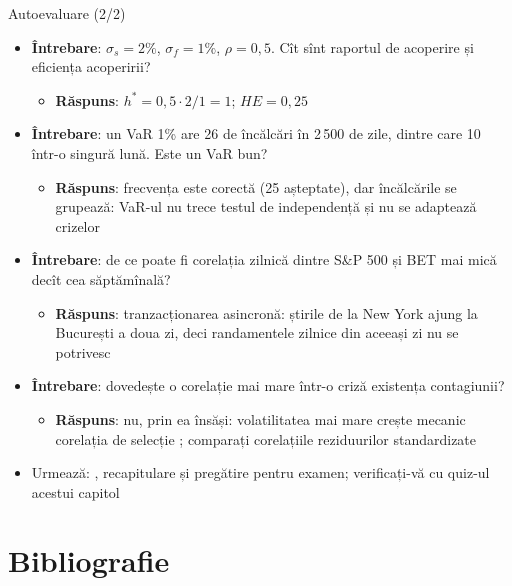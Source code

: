 \begin{frame}{Autoevaluare (2/2)}
\itemsize{\footnotesize}
\begin{itemize}
    \item \textbf{Întrebare}: $\sigma_s = 2\%$, $\sigma_f = 1\%$, $\rho = 0{,}5$. Cît sînt raportul de acoperire și eficiența acoperirii?
    \begin{itemize}
        \item \textbf{Răspuns}: $h^* = 0{,}5 \cdot 2/1 = 1$; $HE = 0{,}25$
    \end{itemize}
    \item \textbf{Întrebare}: un VaR 1\% are 26 de încălcări în 2\,500 de zile, dintre care 10 într-o singură lună. Este un VaR bun?
    \begin{itemize}
        \item \textbf{Răspuns}: frecvența este corectă (25 așteptate), dar încălcările se grupează: VaR-ul nu trece testul de independență și nu se adaptează crizelor
    \end{itemize}
    \item \textbf{Întrebare}: de ce poate fi corelația zilnică dintre S\&P 500 și BET mai mică decît cea săptămînală?
    \begin{itemize}
        \item \textbf{Răspuns}: tranzacționarea asincronă: știrile de la New York ajung la București a doua zi, deci randamentele zilnice din aceeași zi nu se potrivesc
    \end{itemize}
    \item \textbf{Întrebare}: dovedește o corelație mai mare într-o criză existența contagiunii?
    \begin{itemize}
        \item \textbf{Răspuns}: nu, prin ea însăși: volatilitatea mai mare crește mecanic corelația de selecție ; comparați corelațiile reziduurilor standardizate
    \end{itemize}
    \item Urmează: , recapitulare și pregătire pentru examen; verificați-vă cu quiz-ul acestui capitol
\end{itemize}
\end{frame}


\section{Bibliografie}

